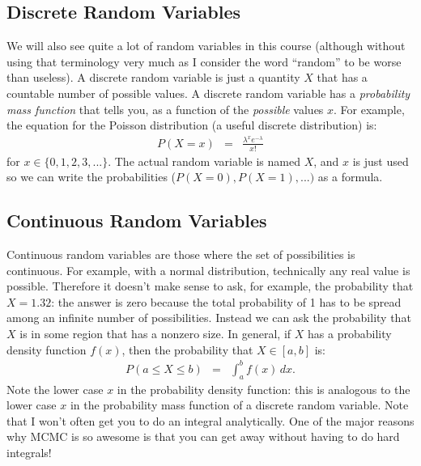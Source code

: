 \subsection{Discrete Random Variables}
We will also see quite a lot of random variables in this course (although
without using that terminology very much as I consider the word ``random'' to be
worse than useless). A discrete
random variable is just a quantity $X$ that has a countable number of possible
values. A discrete random variable has a {\it probability mass function}
that tells you, as a function of the {\it possible} values $x$.
For example, the equation for the Poisson distribution (a useful discrete
distribution) is:
\begin{eqnarray}
P(X=x) &=& \frac{\lambda^x e^{-\lambda}}{x!}\label{eq:poisson}
\end{eqnarray}
for $x \in \{0, 1, 2, 3, ...\}$. The actual random variable is named $X$, and
$x$ is just used so we can write the probabilities ($P(X=0), P(X=1), ...)$ as
a formula.

\subsection{Continuous Random Variables}
Continuous random variables are those where the set of possibilities is
continuous. For example, with a normal distribution, technically any real value
is possible. Therefore it doesn't make sense to ask, for example, the probability
that $X=1.32$: the answer is zero because the total probability of 1 has to be
spread among an infinite number of possibilities. Instead we can ask the probability
that $X$ is in some region that has a nonzero size. In general, if $X$ has a
probability density function $f(x)$, then the probability that $X \in [a, b]$ is:
\begin{eqnarray}
P(a \leq X \leq b) &=& \int_a^b f(x) \, dx.
\end{eqnarray}
Note the lower case $x$ in the probability density function: this is analogous
to the lower case $x$ in the probability mass function of a discrete random
variable. Note that I won't often get you to do an integral analytically. One
of the major reasons why MCMC is so awesome is that you can get away without
having to do hard integrals!

